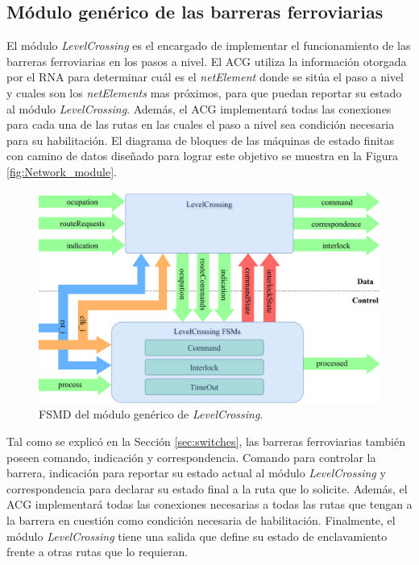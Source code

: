 \subsection{Módulo genérico de las barreras ferroviarias}
	\label{sec:ACG_lc}
	
	El módulo \textit{LevelCrossing} es el encargado de implementar el funcionamiento de las barreras ferroviarias en los pasos a nivel. El ACG utiliza la información otorgada por el RNA para determinar cuál es el \textit{netElement} donde se sitúa el paso a nivel y cuales son los \textit{netElements} mas próximos, para que puedan reportar su estado al módulo \textit{LevelCrossing}. Además, el ACG implementará todas las conexiones para cada una de las rutas en las cuales el paso a nivel sea condición necesaria para su habilitación. El diagrama de bloques de las máquinas de estado finitas con camino de datos diseñado para lograr este objetivo se muestra en la Figura \ref{fig:Network_module}.
	
	\begin{figure}[H]
		\centering
		\includegraphics[width=1\textwidth]{Figuras/LCB_module}
		\centering\caption{FSMD del módulo genérico de \textit{LevelCrossing}.}
		\label{fig:LCB_module}
	\end{figure}
	
	Tal como se explicó en la Sección \ref{sec:switches}, las barreras ferroviarias también poseen comando, indicación y correspondencia. Comando para controlar la barrera, indicación para reportar su estado actual al módulo \textit{LevelCrossing} y correspondencia para declarar su estado final a la ruta que lo solicite. Además, el ACG implementará todas las conexiones necesarias a todas las rutas que tengan a la barrera en cuestión como condición necesaria de habilitación. Finalmente, el módulo \textit{LevelCrossing} tiene una salida que define su estado de enclavamiento frente a otras rutas que lo requieran.
	
